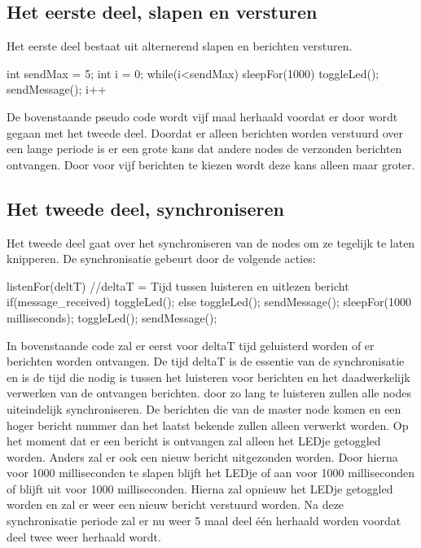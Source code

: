 \documentclass{article}
\begin{document}
\subsection{Het eerste deel, slapen en versturen}
Het eerste deel bestaat uit alternerend slapen en berichten versturen. 
\begin{verbatimtab}
int sendMax = 5;
int i = 0;
while(i<sendMax)
	sleepFor(1000)
	toggleLed();
	sendMessage();
	i++
\end{verbatimtab}
De bovenstaande pseudo code wordt vijf maal herhaald voordat er door wordt gegaan met het tweede deel.
Doordat er alleen berichten worden verstuurd over een lange periode is er een grote kans dat andere nodes de verzonden berichten ontvangen. Door voor vijf berichten te kiezen wordt deze kans alleen maar groter.

\subsection{Het tweede deel, synchroniseren}
Het tweede deel gaat over het synchroniseren van de nodes om ze tegelijk te laten knipperen. De synchronisatie gebeurt door de volgende acties:
\begin{verbatimtab}
listenFor(deltT)       //deltaT = Tijd tussen luisteren en uitlezen bericht
if(message_received){
	toggleLed();
} else {
	toggleLed(); 
	sendMessage();
}
sleepFor(1000 milliseconds);
toggleLed();
sendMessage();
\end{verbatimtab}
In bovenstaande code zal er eerst voor deltaT tijd geluisterd worden of er berichten worden ontvangen.
De tijd deltaT is de essentie van de synchronisatie en is de tijd die nodig is tussen het luisteren voor berichten en het daadwerkelijk verwerken van de ontvangen berichten. door zo lang te luisteren zullen alle nodes uiteindelijk synchroniseren. De berichten die van de master node komen en een hoger bericht nummer dan het laatst bekende zullen alleen verwerkt worden. 
Op het moment dat er een bericht is ontvangen zal alleen het LEDje getoggled worden. Anders zal er ook een nieuw bericht uitgezonden worden. Door hierna voor 1000 milliseconden te slapen blijft het LEDje of aan voor 1000 milliseconden of blijft uit voor 1000 milliseconden. Hierna zal opnieuw het LEDje getoggled worden en zal er weer een nieuw bericht verstuurd worden. Na deze synchronisatie periode zal er nu weer 5 maal deel \'{e}\'{e}n herhaald worden voordat deel twee weer herhaald wordt. 
\end{document}
